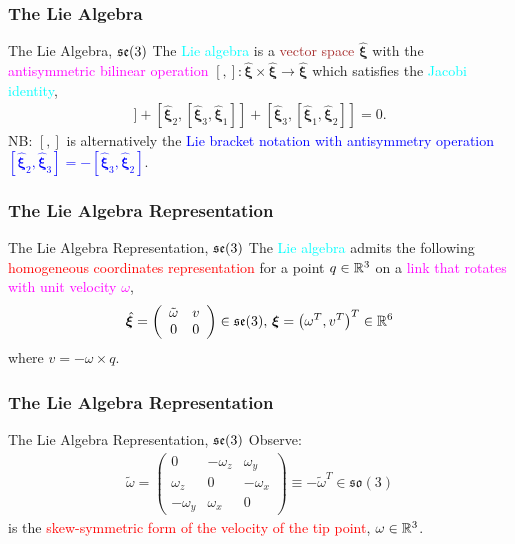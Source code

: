 \begin{frame}
	\frametitle{The Lie Algebra}	
	\begin{block}{The Lie Algebra, $\mathfrak{se}(3)$}
		The \textcolor{cyan}{Lie algebra} is a \textcolor{brown}{vector space} $\hat{\bm{\xi}} $ with the \textcolor{magenta}{antisymmetric bilinear operation} $[,]: \hat{\bm{\xi}}  \times \hat{\bm{\xi}} \rightarrow \hat{\bm{\xi}} $ which satisfies the \textcolor{cyan}{Jacobi identity}, 
		\begin{align}
			[\hat{\bm{\xi}}_1, [\hat{\bm{\xi}}_2, \hat{\bm{\xi}}_3]] +[\hat{\bm{\xi}}_2, [\hat{\bm{\xi}}_3, \hat{\bm{\xi}}_1]] + [\hat{\bm{\xi}}_3, [\hat{\bm{\xi}}_1, \hat{\bm{\xi}}_2]] = 0.
		\end{align}
		\footnotesize{NB: $[,]$ is alternatively the \textcolor{blue}{Lie bracket notation with antisymmetry operation $[\hat{\bm{\xi}}_2, \hat{\bm{\xi}}_3] = -[\hat{\bm{\xi}}_3, \hat{\bm{\xi}}_2]$}.}
	\end{block}
\end{frame}


\begin{frame}
	\frametitle{The Lie Algebra Representation}	
	\begin{block}{The Lie Algebra Representation, $\mathfrak{se}(3)$}
		The \textcolor{cyan}{Lie algebra} admits the following \textcolor{red}{homogeneous coordinates representation} for a point $q \in \mathbb{R}^3$ on a \textcolor{magenta}{link that rotates with unit velocity $\omega$}, 
		\begin{align}
			\hat{\bm{\xi}} =  \left(\begin{array}{cc}
				\tilde{\omega} & v \\
				0 & 0
			\end{array}\right) \in \mathfrak{se}(3), \,\bm{\xi}=\left(\omega^T, v^T\right)^T \in \mathbb{R}^6
		\end{align}
		{where $v = -\omega \times q$.}
	\end{block}
\end{frame}

\begin{frame}
	\frametitle{The Lie Algebra Representation}	
	\begin{block}{The Lie Algebra Representation, $\mathfrak{se}(3)$}
		Observe:  
		\begin{align}
			\tilde{\omega} =  \left(\begin{array}{ccc}
				0 & -\omega_z & \omega_y \\
				\omega_z & 0 & -\omega_x \\
				-\omega_y &  \omega_x & 0
			\end{array}\right) \equiv -\tilde{\omega}^T \in \mathfrak{so}(3)
		\end{align}
		{is the \textcolor{red}{skew-symmetric form of the velocity of the tip point}, $\omega \in \mathbb{R}^3$.}
	\end{block}
\end{frame}

